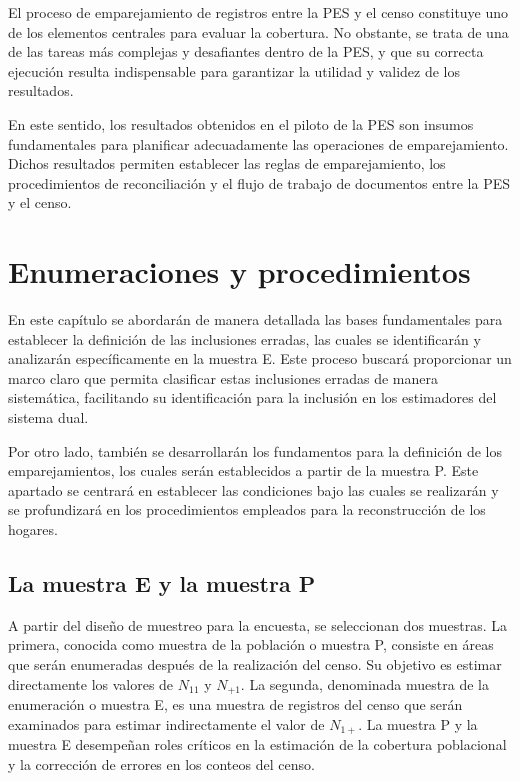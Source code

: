 \documentclass[
  12pt,
]{book}
\begin{document}
El proceso de emparejamiento de registros entre la PES y el censo constituye uno de los elementos centrales para evaluar la cobertura. No obstante, se trata de una de las tareas más complejas y desafiantes dentro de la PES, y que su correcta ejecución resulta indispensable para garantizar la utilidad y validez de los resultados.

En este sentido, los resultados obtenidos en el piloto de la PES son insumos fundamentales para planificar adecuadamente las operaciones de emparejamiento. Dichos resultados permiten establecer las reglas de emparejamiento, los procedimientos de reconciliación y el flujo de trabajo de documentos entre la PES y el censo.

\chapter{Enumeraciones y procedimientos}\label{cap4}

En este capítulo se abordarán de manera detallada las bases fundamentales para establecer la definición de las inclusiones erradas, las cuales se identificarán y analizarán específicamente en la muestra E. Este proceso buscará proporcionar un marco claro que permita clasificar estas inclusiones erradas de manera sistemática, facilitando su identificación para la inclusión en los estimadores del sistema dual.

Por otro lado, también se desarrollarán los fundamentos para la definición de los emparejamientos, los cuales serán establecidos a partir de la muestra P. Este apartado se centrará en establecer las condiciones bajo las cuales se realizarán y se profundizará en los procedimientos empleados para la reconstrucción de los hogares.

\section{La muestra E y la muestra P}\label{la-muestra-e-y-la-muestra-p}

A partir del diseño de muestreo para la encuesta, se seleccionan dos muestras. La primera, conocida como muestra de la población o muestra P, consiste en áreas que serán enumeradas después de la realización del censo. Su objetivo es estimar directamente los valores de \(N_{11}\) y \(N_{+1}\). La segunda, denominada muestra de la enumeración o muestra E, es una muestra de registros del censo que serán examinados para estimar indirectamente el valor de \(N_{1+}\). La muestra P y la muestra E desempeñan roles críticos en la estimación de la cobertura poblacional y la corrección de errores en los conteos del censo.
\end{document}
